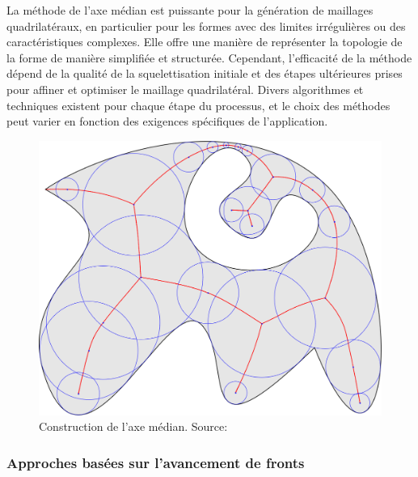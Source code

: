 La méthode de l'axe médian est puissante pour la génération de maillages quadrilatéraux, en particulier pour les formes avec des limites irrégulières ou des caractéristiques complexes. Elle offre une manière de représenter la topologie de la forme de manière simplifiée et structurée. Cependant, l'efficacité de la méthode dépend de la qualité de la squelettisation initiale et des étapes ultérieures prises pour affiner et optimiser le maillage quadrilatéral. Divers algorithmes et techniques existent pour chaque étape du processus, et le choix des méthodes peut varier en fonction des exigences spécifiques de l'application.

\begin{figure}
    \centering
    \includegraphics[scale=0.3]{images/median_axis.png}
    \caption{Construction de l'axe médian. Source: \cite{de2009fast}}
    \label{fig:median_axis}
\end{figure}

\subsubsection{Approches basées sur l'avancement de fronts}

